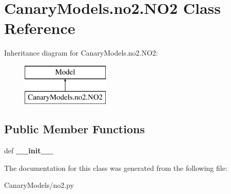 \hypertarget{class_canary_models_1_1no2_1_1_n_o2}{\section{Canary\-Models.\-no2.\-N\-O2 Class Reference}
\label{class_canary_models_1_1no2_1_1_n_o2}
}
Inheritance diagram for Canary\-Models.\-no2.\-N\-O2\-:\begin{figure}[H]
\begin{center}
\leavevmode
\includegraphics[height=2.000000cm]{class_canary_models_1_1no2_1_1_n_o2}
\end{center}
\end{figure}
\subsection*{Public Member Functions}
\begin{DoxyCompactItemize}
\item 
\hypertarget{class_canary_models_1_1no2_1_1_n_o2_af74ce951b0f91dffd099e24e3f69ebbd}{def {\bfseries \-\_\-\-\_\-init\-\_\-\-\_\-}}\label{class_canary_models_1_1no2_1_1_n_o2_af74ce951b0f91dffd099e24e3f69ebbd}

\end{DoxyCompactItemize}


The documentation for this class was generated from the following file\-:\begin{DoxyCompactItemize}
\item 
Canary\-Models/no2.\-py\end{DoxyCompactItemize}
